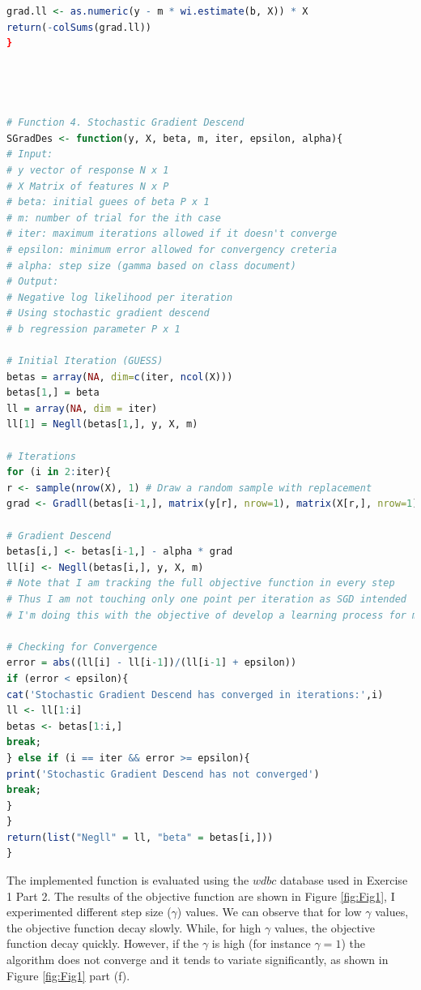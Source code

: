 \documentclass[11 pt]{article}
\begin{document}
\begin{enumerate}[label=(\Alph*)]
\begin{lstlisting}[language=R]
grad.ll <- as.numeric(y - m * wi.estimate(b, X)) * X
return(-colSums(grad.ll))
}




# Function 4. Stochastic Gradient Descend 
SGradDes <- function(y, X, beta, m, iter, epsilon, alpha){
# Input:
# y vector of response N x 1
# X Matrix of features N x P
# beta: initial guees of beta P x 1
# m: number of trial for the ith case
# iter: maximum iterations allowed if it doesn't converge
# epsilon: minimum error allowed for convergency creteria
# alpha: step size (gamma based on class document)
# Output:
# Negative log likelihood per iteration
# Using stochastic gradient descend
# b regression parameter P x 1

# Initial Iteration (GUESS)
betas = array(NA, dim=c(iter, ncol(X)))
betas[1,] = beta
ll = array(NA, dim = iter)
ll[1] = Negll(betas[1,], y, X, m)

# Iterations
for (i in 2:iter){
r <- sample(nrow(X), 1) # Draw a random sample with replacement
grad <- Gradll(betas[i-1,], matrix(y[r], nrow=1), matrix(X[r,], nrow=1), m)

# Gradient Descend
betas[i,] <- betas[i-1,] - alpha * grad 
ll[i] <- Negll(betas[i,], y, X, m)
# Note that I am tracking the full objective function in every step
# Thus I am not touching only one point per iteration as SGD intended
# I'm doing this with the objective of develop a learning process for myself

# Checking for Convergence
error = abs((ll[i] - ll[i-1])/(ll[i-1] + epsilon))
if (error < epsilon){
cat('Stochastic Gradient Descend has converged in iterations:',i)
ll <- ll[1:i]
betas <- betas[1:i,]
break;
} else if (i == iter && error >= epsilon){
print('Stochastic Gradient Descend has not converged')
break;
}
}
return(list("Negll" = ll, "beta" = betas[i,]))
}

	\end{lstlisting}
	
	\vspace{5mm}
	The implemented function is evaluated using the $wdbc$ database used in Exercise 1 Part 2. The results of the objective function are shown in Figure \ref{fig:Fig1}, I experimented different step size ($\gamma$) values. We can observe that for low $\gamma$ values,  the objective function decay slowly. While, for high $\gamma$ values, the objective function decay quickly. However, if the $\gamma$ is high (for instance $\gamma=1$) the algorithm does not converge and it tends to variate significantly, as shown in Figure \ref{fig:Fig1} part (f).


\end{enumerate}
\end{document}
